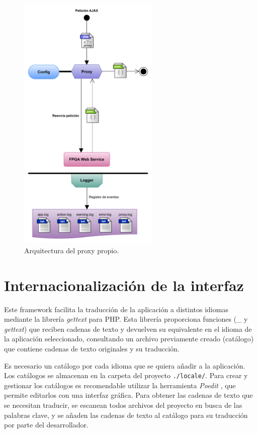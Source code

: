 \begin{figure}[!htp]
  \centering
  \includegraphics[width=0.6\textwidth,clip=true]{graphics/proxy}
  \caption{Arquitectura del proxy propio.}
  \label{fig:proxy}
\end{figure}

\section{Internacionalización de la interfaz\label{extra:mvc:i18n}}

Este \gls{framework} facilita la traducción de la aplicación a distintos idiomas mediante la librería \textit{gettext} \cite{gettext} para \gls{PHP}. Esta librería proporciona funciones (\textit{\_} y \textit{gettext}) que reciben cadenas de texto y devuelven su equivalente en el idioma de la aplicación seleccionado, consultando un archivo previamente creado (catálogo) que contiene cadenas de texto originales y su traducción.

Es necesario un catálogo por cada idioma que se quiera añadir a la aplicación. Los catálogos se almacenan en la carpeta del proyecto \texttt{./locale/}. Para crear y gestionar los catálogos es recomendable utilizar la herramienta \textit{Poedit} \cite{poedit}, que permite editarlos con una interfaz gráfica. Para obtener las cadenas de texto que se necesitan traducir, se escanean todos archivos del proyecto en busca de las palabras clave, y se añaden las cadenas de texto al catálogo para su traducción por parte del desarrollador.

